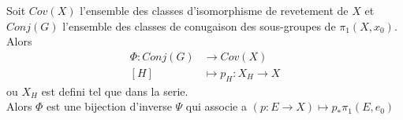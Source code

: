 \documentclass[../main.tex]{subfiles}
\begin{document}
\begin{thm}
Soit $Cov( X) $ l'ensemble des classes d'isomorphisme de revetement de $X$ et $Conj( G) $ l'ensemble des classes de conugaison des sous-groupes de $\pi_1( X,x_0)$.\\
Alors 
\begin{align*}
	\Phi: Conj( G) & \to Cov( X) \\
	[ H] &\mapsto p_H :X_H\to X
\end{align*}
ou $X_H$ est defini tel que dans la serie.\\
Alors $\Phi$ est une bijection d'inverse $\Psi$ qui associe a $( p:E\to X ) \mapsto p_\ast \pi_1( E,e_0)  $ 
\end{thm}








		
\end{document}
